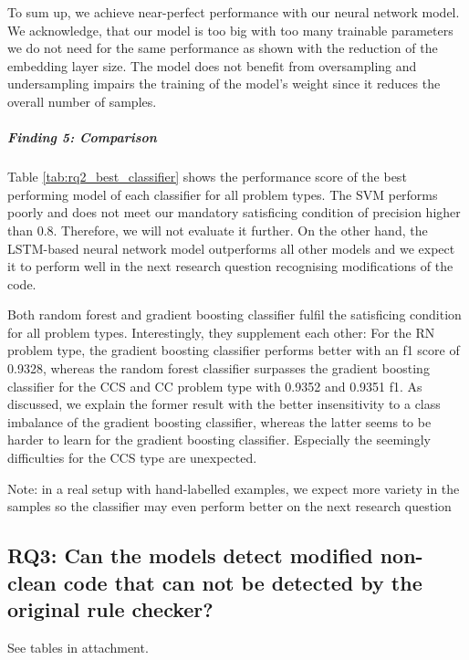 To sum up, we achieve near-perfect performance with our neural network model. We acknowledge, that our model is too big with too many trainable parameters we do not need for the same performance as shown with the reduction of the embedding layer size. The model does not benefit from oversampling and undersampling impairs the training of the model's weight since it reduces the overall number of samples.

\subparagraph{Finding 5: Comparison}

 Table \ref{tab:rq2_best_classifier} shows the performance score of the best performing model of each classifier for all problem types.
 The SVM performs poorly and does not meet our mandatory satisficing condition of precision higher than 0.8. Therefore, we will not evaluate it further. On the other hand, the LSTM-based neural network model outperforms all other models and we expect it to perform well in the next research question recognising modifications of the code.

 Both random forest and gradient boosting classifier fulfil the satisficing condition for all problem types. Interestingly, they supplement each other: For the RN problem type, the gradient boosting classifier performs better with an f1 score of 0.9328, whereas the random forest classifier surpasses the gradient boosting classifier for the CCS and CC problem type with 0.9352 and 0.9351 f1. As discussed, we explain the former result with the better insensitivity to a class imbalance of the gradient boosting classifier, whereas the latter seems to be harder to learn for the gradient boosting classifier. Especially the seemingly difficulties for the CCS type are unexpected.
 
 Note: in a real setup with hand-labelled examples, we expect more variety in the samples so the classifier may even perform better on the next research question 


 \subsection{RQ3: Can the models detect modified non-clean code that can not be detected by the original rule checker? }
See tables in attachment.
